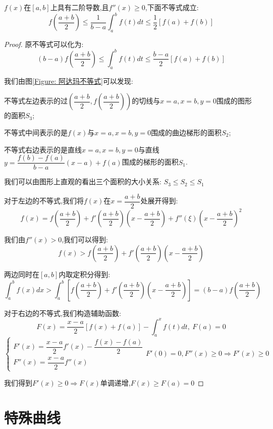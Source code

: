 \begin{theorem}\label{thm: 阿达玛不等式}

	$f(x)$在$[a,b]$上具有二阶导数,且$f''(x)\geq 0$,下面不等式成立:  
	$$f(\dfrac{a+b}{2})\leq \dfrac{1}{b-a}\int_{a}^{b}f(t)dt\leq \dfrac{1}{2}[f(a)+f(b)]$$
	\begin{proof}
		
		原不等式可以化为:  
		$$(b-a)f(\dfrac{a+b}{2})\leq\int_{a}^{b}f(t)dt\leq\dfrac{b-a}{2}[f(a)+f(b)]$$
		
		我们由图\ref{Figure: 阿达玛不等式}可以发现:  
		
		不等式左边表示的过$(\dfrac{a+b}{2},f(\dfrac{a+b}{2}))$的切线与$x=a,x=b,y=0$围成的图形的面积$S_{3}$;
		
		不等式中间表示的是$f(x)$与$x=a,x=b,y=0$围成的曲边梯形的面积$S_{2}$;
		
		不等式右边表示的是直线$x=a,x=b,y=0$与直线$y=\dfrac{f(b)-f(a)}{b-a}(x-a)+f(a)$围成的梯形的面积$S_{1}$.
		
		我们可以由图形上直观的看出三个面积的大小关系:  $S_{3}\leq S_{2}\leq S_{1}$
		
		对于左边的不等式,我们将$f(x)$在$x=\dfrac{a+b}{2}$处展开得到:  
		$$f(x)=f(\dfrac{a+b}{2})+f'(\dfrac{a+b}{2})(x-\dfrac{a+b}{2})+f''(\xi)(x-\dfrac{a+b}{2})^2$$
		
		我们由$f''(x)>0$,我们可以得到:  
		$$f(x)>f(\dfrac{a+b}{2})+f'(\dfrac{a+b}{2})(x-\dfrac{a+b}{2})$$
		
		两边同时在$[a,b]$内取定积分得到:  
		$$\int_{a}^{b}f(x)dx>\int_{a}^{b}[f(\dfrac{a+b}{2})+f'(\dfrac{a+b}{2})(x-\dfrac{a+b}{2})]=(b-a)f(\dfrac{a+b}{2})$$
		
		对于右边的不等式,我们构造辅助函数:  
		$$F(x)=\dfrac{x-a}{2}[f(x)+f(a)]-\int_{a}^{x}f(t)dt,\ F(a)=0$$
		$$\left\lbrace
		\begin{array}{l}
			F'(x)=\dfrac{x-a}{2}f'(x)-\dfrac{f(x)-f(a)}{2}\\
			F''(x)=\dfrac{x-a}{2}f''(x)
		\end{array}
		\right. F'(0)=0,F''(x)\geq 0\Rightarrow F'(x)\geq 0$$
		
		我们得到$F'(x)\geq 0\Rightarrow F(x)\text{单调递增}$,$F(x)\geq F(a)=0$
	\end{proof}
\end{theorem}

\section{特殊曲线}

